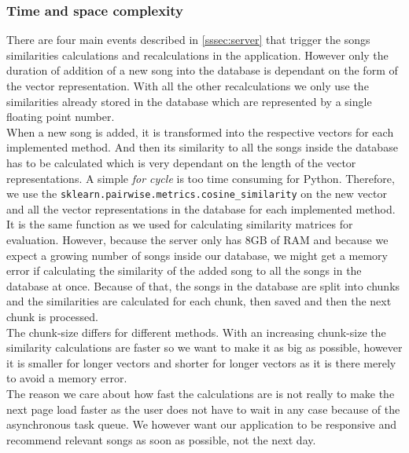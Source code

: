 \subsubsection{Time and space complexity}

There are four main events described in \ref{sssec:server} that trigger the songs similarities calculations and recalculations in the application. However only the duration of addition of a new song into the database is dependant on the form of the vector representation. With all the other recalculations we only use the similarities already stored in the database which are represented by a single floating point number. \\

When a new song is added, it is transformed into the respective vectors for each implemented method. And then its similarity to all the songs inside the database has to be calculated which is very dependant on the length of the vector representations. A simple \textit{for cycle} is too time consuming for Python. Therefore, we use the \texttt{sklearn.pairwise.metrics.cosine\_similarity} on the new vector and all the vector representations in the database for each implemented method. It is the same function as we used for calculating similarity matrices for evaluation. However, because the server only has 8GB of RAM and because we expect a growing number of songs inside our database, we might get a memory error if calculating the similarity of the added song to all the songs in the database at once. Because of that, the songs in the database are split into chunks and the similarities are calculated for each chunk, then saved and then the next chunk is processed. \\
The chunk-size differs for different methods. With an increasing chunk-size the similarity calculations are faster so we want to make it as big as possible, however it is smaller for longer vectors and shorter for longer vectors as it is there merely to avoid a memory error. \\
The reason we care about how fast the calculations are is not really to make the next page load faster as the user does not have to wait in any case because of the asynchronous task queue. We however want our application to be responsive and recommend relevant songs as soon as possible, not the next day. \\

